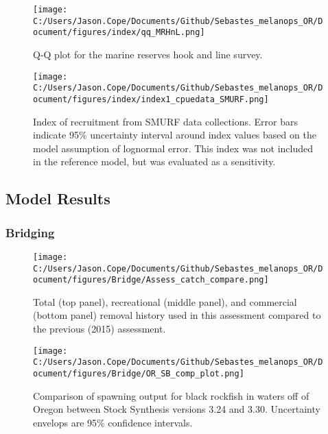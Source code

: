 \documentclass[11pt,
  english,
  letterpaper,
]{article}
\begin{document}
\newpage

\begin{figure}
\centering
\texttt{[image: C:/Users/Jason.Cope/Documents/Github/Sebastes\_melanops\_OR/Document/figures/index/qq\_MRHnL.png]}
\caption{Q-Q plot for the marine reserves hook and line survey.\label{fig:qq_MRHnL}}
\end{figure}

\newpage

\begin{figure}
\centering
\texttt{[image: C:/Users/Jason.Cope/Documents/Github/Sebastes\_melanops\_OR/Document/figures/index/index1\_cpuedata\_SMURF.png]}
\caption{Index of recruitment from SMURF data collections. Error bars indicate 95\% uncertainty interval around index values based on the model assumption of lognormal error. This index was not included in the reference model, but was evaluated as a sensitivity.\label{fig:index1_cpuedata_SMURF}}
\end{figure}

\newpage

\hypertarget{model-results}{%
\subsection{Model Results}\label{model-results}}

\hypertarget{bridging}{%
\subsubsection{Bridging}\label{bridging}}

\begin{figure}
\centering
\texttt{[image: C:/Users/Jason.Cope/Documents/Github/Sebastes\_melanops\_OR/Document/figures/Bridge/Assess\_catch\_compare.png]}
\caption{Total (top panel), recreational (middle panel), and commercial (bottom panel) removal history used in this assessment compared to the previous (2015) assessment.\label{fig:catch-bridge}}
\end{figure}

\newpage

\begin{figure}
\centering
\texttt{[image: C:/Users/Jason.Cope/Documents/Github/Sebastes\_melanops\_OR/Document/figures/Bridge/OR\_SB\_comp\_plot.png]}
\caption{Comparison of spawning output for black rockfish in waters off of Oregon between Stock Synthesis versions 3.24 and 3.30. Uncertainty envelops are 95\% confidence intervals.\label{fig:ssb-bridge-comps}}
\end{figure}
\end{document}
